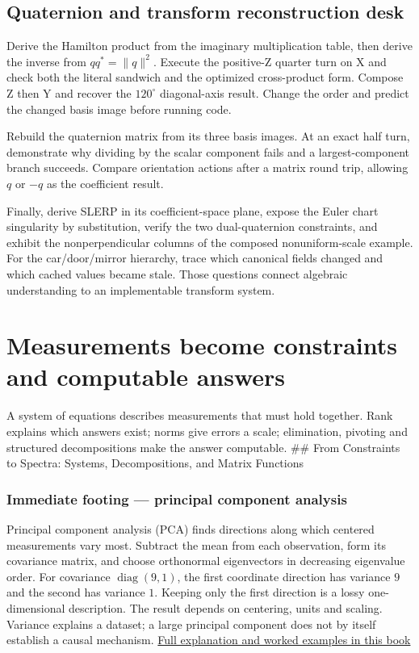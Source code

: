 \subsection{Quaternion and transform reconstruction desk}\label{01-foundations-i-ch019-quaternion-and-transform-reconstruction-desk}

Derive the Hamilton product from the imaginary multiplication table, then derive the inverse from \(qq^*=\|q\|^2\). Execute the positive-Z quarter turn on X and check both the literal sandwich and the optimized cross-product form. Compose Z then Y and recover the \(120^\circ\) diagonal-axis result. Change the order and predict the changed basis image before running code.

Rebuild the quaternion matrix from its three basis images. At an exact half turn, demonstrate why dividing by the scalar component fails and a largest-component branch succeeds. Compare orientation actions after a matrix round trip, allowing \(q\) or \(-q\) as the coefficient result.

Finally, derive SLERP in its coefficient-space plane, expose the Euler chart singularity by substitution, verify the two dual-quaternion constraints, and exhibit the nonperpendicular columns of the composed nonuniform-scale example. For the car/door/mirror hierarchy, trace which canonical fields changed and which cached values became stale. Those questions connect algebraic understanding to an implementable transform system.

\section{Measurements become constraints and computable answers}\label{01-foundations-i-ch019-measurements-become-constraints-and-computable-answers}

A system of equations describes measurements that must hold together. Rank explains which answers exist; norms give errors a scale; elimination, pivoting and structured decompositions make the answer computable. \#\# From Constraints to Spectra: Systems, Decompositions, and Matrix Functions

\subsubsection{Immediate footing --- principal component analysis}\label{01-foundations-i-ch019-immediate-footing-principal-component-analysis}

Principal component analysis (PCA) finds directions along which centered measurements vary most. Subtract the mean from each observation, form its covariance matrix, and choose orthonormal eigenvectors in decreasing eigenvalue order. For covariance \(\operatorname{diag}(9,1)\), the first coordinate direction has variance \(9\) and the second has variance \(1\). Keeping only the first direction is a lossy one-dimensional description. The result depends on centering, units and scaling. Variance explains a dataset; a large principal component does not by itself establish a causal mechanism. \hyperref[02-foundations-ii-ch024-pca-turns-a-cloud-of-points-into-measured-variation]{Full explanation and worked examples in this book}

